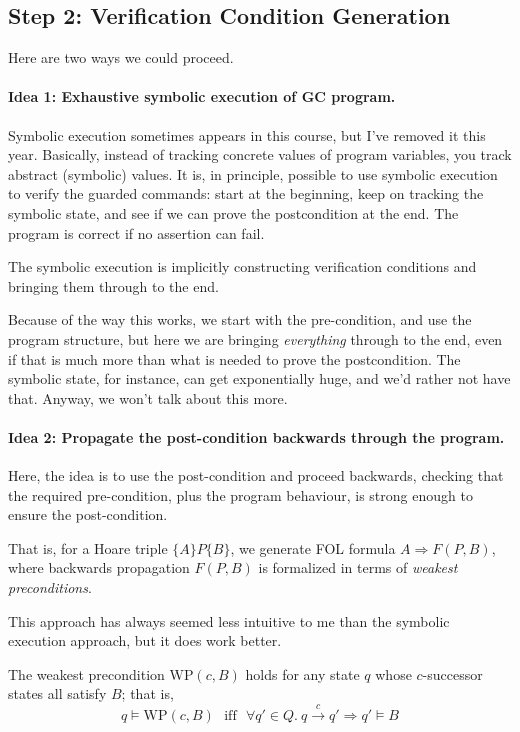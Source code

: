 \subsection*{Step 2: Verification Condition Generation}
Here are two ways we could proceed.

\paragraph{Idea 1: Exhaustive symbolic execution of GC program.}
Symbolic execution sometimes appears in this course, but I've removed it this year.
Basically, instead of tracking concrete values of program variables, you track abstract (symbolic) values.
It is, in principle, possible to use symbolic execution to verify the guarded commands:
start at the beginning, keep on tracking the symbolic state, and see if we can prove the postcondition at the end.
The program is correct if no assertion can fail.

The symbolic execution is implicitly constructing verification conditions and bringing them through to the end.

Because of the way this works, we start with the pre-condition, and use the program structure, but here we are
bringing \emph{everything} through to the end, even if that is much more than what is needed to prove the postcondition.
The symbolic state, for instance, can get exponentially huge, and we'd rather not have that. Anyway, we won't
talk about this more.

\paragraph{Idea 2: Propagate the post-condition backwards through the program.} Here, the idea is to use the post-condition
and proceed backwards, checking that the required pre-condition, plus the program behaviour, is strong enough to ensure
the post-condition.

That is, for a Hoare triple
$\{ A \} P \{ B \}$, we generate FOL formula $A \Rightarrow F(P, B)$, where backwards propagation $F(P, B)$ is formalized
in terms of \emph{weakest preconditions}.

This approach has always seemed less intuitive to me than the symbolic execution approach, but it does work better.

The weakest precondition $\mathrm{WP}(c, B)$ holds for any state $q$ whose $c$-successor states
all satisfy $B$; that is,
\[
q \models \mathrm{WP}(c, B) \mathrm{~~~iff~~~} \forall q' \in Q. ~q \xrightarrow{c} q' \Rightarrow q' \models B
\]

